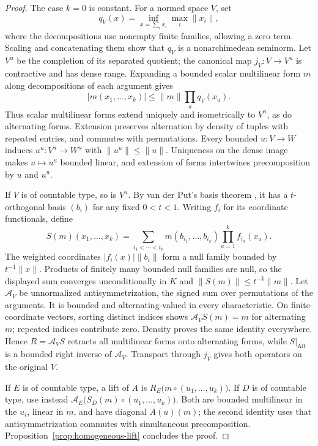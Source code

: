 \documentclass[11pt]{amsart}
\theoremstyle{definition}
\theoremstyle{remark}
\numberwithin{equation}{section}
\newcommand{\Alt}{\operatorname{Alt}}
\newcommand{\abs}[1]{\lvert #1\rvert}
\newcommand{\norm}[1]{\lVert #1\rVert}
\theoremstyle{plain}
\theoremstyle{definition}
\theoremstyle{plain}
\begin{document}
\begin{proof}
The case $k=0$ is constant. For a normed space $V$, set
\[
 q_V(x)=\inf_{x=\sum_i x_i}\max_i\norm{x_i},
\]
where the decompositions use nonempty finite families, allowing a zero term. Scaling and concatenating them show that
$q_V$ is a nonarchimedean seminorm. Let $V^u$ be the completion of its separated quotient;
the canonical map $j_V\colon V\to V^u$ is contractive and has dense range.
Expanding a bounded scalar multilinear form $m$ along decompositions of each argument gives
\[
 \abs{m(x_1,\ldots,x_k)}\le\norm m\prod_a q_V(x_a).
\]
Thus scalar multilinear forms extend uniquely and isometrically to $V^u$, as do
alternating forms. Extension preserves alternation by density of tuples with repeated
entries, and commutes with permutations. Every bounded $u\colon V\to W$ induces
$u^u\colon V^u\to W^u$ with $\norm{u^u}\le\norm u$. Uniqueness on the dense image makes
$u\mapsto u^u$ bounded linear, and extension of forms intertwines precomposition by $u$ and $u^u$.

If $V$ is of countable type, so is $V^u$. By van der Put's basis theorem
\cite[Proposition~1.4]{VdP}, it has a $t$\nobreakdash-orthogonal basis $(b_i)$ for any
fixed $0<t<1$. Writing $f_i$ for its coordinate functionals, define
\[
 S(m)(x_1,\ldots,x_k)
 =\sum_{i_1<\cdots<i_k}m(b_{i_1},\ldots,b_{i_k})
                        \prod_{a=1}^k f_{i_a}(x_a).
\]
The weighted coordinates $\abs{f_i(x)}\norm{b_i}$ form a null family bounded by
$t^{-1}\norm x$. Products of finitely many bounded null families are null, so the
displayed sum converges unconditionally in $K$ and $\norm{S(m)}\le t^{-k}\norm m$.
Let $\mathcal A_V$ be unnormalized antisymmetrization, the signed sum over permutations
of the arguments. It is bounded and alternating-valued in every characteristic.
On finite-coordinate vectors, sorting distinct indices shows
$\mathcal A_V S(m)=m$ for alternating $m$; repeated indices contribute zero.
Density proves the same identity everywhere. Hence $R=\mathcal A_V S$ retracts all
multilinear forms onto alternating forms, while $S|_{\Alt}$ is a bounded right inverse
of $\mathcal A_V$. Transport through $j_V$ gives both operators on the original $V$.

If $E$ is of countable type, a lift of $A$ is
$R_E\bigl(m\circ(u_1,\ldots,u_k)\bigr)$.
If $D$ is of countable type, use instead
$\mathcal A_E\bigl(S_D(m)\circ(u_1,\ldots,u_k)\bigr)$.
Both are bounded multilinear in the $u_i$, linear in $m$, and have diagonal $A(u)(m)$;
the second identity uses that antisymmetrization commutes with simultaneous precomposition.
Proposition~\ref{prop:homogeneous-lift} concludes the proof.
\end{proof}
\end{document}
